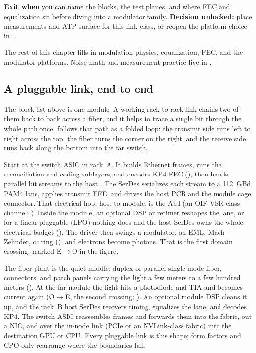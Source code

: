\textbf{Exit when} you can name the blocks, the test planes, and where FEC and
equalization sit before diving into a modulator family. \textbf{Decision
unlocked:} place measurements and ATP surface for this link class, or reopen
the platform choice in .

The rest of this chapter fills in modulation physics, equalization, FEC, and the
modulator platforms. Noise math and measurement practice live in
.

\subsection{A pluggable link, end to end}
\label{sec:link-chain}

The block list above is one module. A working rack-to-rack link chains two of them
back to back across a fiber, and it helps to trace a single bit through the whole
path once.  follows that path as a folded loop: the transmit
side runs left to right across the top, the fiber turns the corner on the right,
and the receive side runs back along the bottom into the far switch.

Start at the switch ASIC in rack~A. It builds Ethernet frames, runs the
reconciliation and coding sublayers, and encodes KP4 FEC (),
then hands parallel bit streams to the host . The SerDes serializes each
stream to a 112~GBd PAM4 lane, applies transmit FFE, and drives the host PCB and the
module cage connector. That electrical hop, host to module, is the AUI (an OIF VSR-class
channel; ). Inside the module, an optional DSP or retimer
reshapes the lane, or for a linear pluggable (LPO) nothing does and the host SerDes
owns the whole electrical budget (). The driver
then swings a modulator, an EML, Mach--Zehnder, or ring
(), and electrons become photons. That is the
first domain crossing, marked E$\to$O in the figure.

The fiber plant is the quiet middle: duplex or parallel single-mode fiber, connectors,
and patch panels carrying the light a few meters to a few hundred meters
(). At the far module the light hits a photodiode
and TIA and becomes current again (O$\to$E, the second crossing;
). An optional module DSP cleans it up, and the rack~B host SerDes
recovers timing, equalizes the lane, and decodes KP4. The switch ASIC reassembles
frames and forwards them into the fabric, out a NIC, and over the in-node link
(PCIe or an NVLink-class fabric) into the destination GPU or CPU. Every pluggable
link is this shape; form factors and CPO only rearrange where the boundaries fall.

